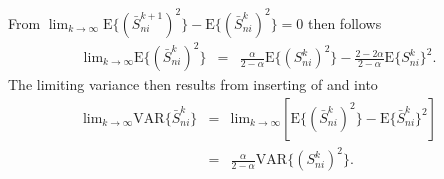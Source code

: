 From $\lim_{k\rightarrow\infty}\text{E}\{(\bar{S}_{ni}^{k+1})^{2}\}-\text{E}\{(\bar{S}_{ni}^{k})^{2}\}=0$
then follows
\begin{eqnarray}
\text{lim}_{k\rightarrow\infty}\text{E}\{(\bar{S}_{ni}^{k})^{2}\} 
& = & 
\frac{\alpha}{2-\alpha}\text{E}\{(S_{ni}^{k})^{2}\}-\frac{2-2\alpha}{2-\alpha}\text{E}\{S_{ni}^{k}\}^{2}. \label{eq:second-score-moment}
\end{eqnarray}
%
The limiting variance then results from inserting of  and  into
\begin{eqnarray}
\text{lim}_{k\rightarrow\infty}\text{VAR}\{\bar{S}_{ni}^{k}\} 
& = & \text{lim}_{k\rightarrow\infty}\left[\text{E}\{(\bar{S}_{ni}^{k})^{2}\}-\text{E}\{\bar{S}_{ni}^{k}\}^{2}\right]\\
 & = & \frac{\alpha}{2-\alpha}\text{VAR}\{(S_{ni}^{k})^{2}\}.
\end{eqnarray}


